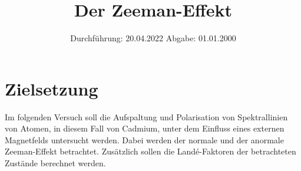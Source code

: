 

\subject{V27}
\title{Der Zeeman-Effekt}
\date{
    Durchführung: 20.04.2022
     \hspace{3em}
    Abgabe: 01.01.2000
}


\maketitle
\thispagestyle{empty}
\tableofcontents
\newpage

\section{Zielsetzung}

    Im folgenden Versuch soll die Aufspaltung und Polarisation von Spektrallinien von Atomen,
    in diesem Fall von Cadmium,
    unter dem Einfluss eines externen Magnetfelds untersucht werden.
    Dabei werden der normale und der anormale Zeeman-Effekt betrachtet.
    Zusätzlich sollen die Landé-Faktoren der betrachteten Zustände berechnet werden.


\clearpage


\clearpage


\clearpage


\clearpage

\printbibliography


